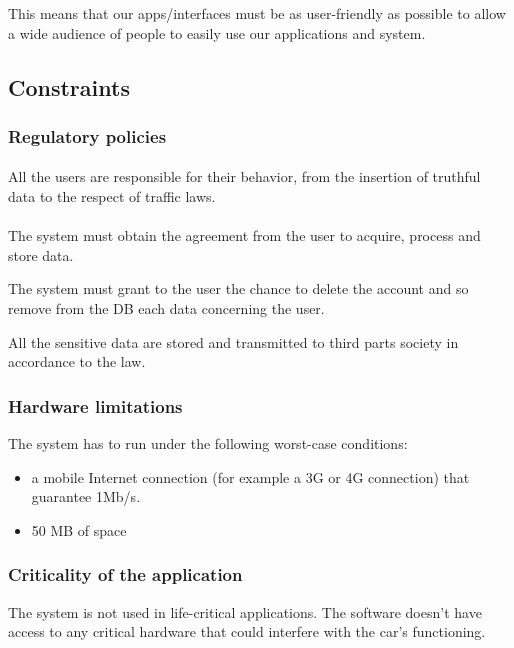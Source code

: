 \documentclass[english]{article}
\begin{document}
This means that our apps/interfaces must be as user-friendly as possible to allow a wide audience of people to easily use our applications and system.

\newpage
\subsection{Constraints}\label{constraints}

\subsubsection{Regulatory policies}

\paragraph{}
All the users are responsible for their behavior, from the insertion of truthful data to the respect of traffic laws.

\paragraph{}
The system must obtain the agreement from the user to acquire, process and store data.

The system must grant to the user the chance to delete the account and so remove from the DB each data concerning the user.

All the sensitive data are stored and transmitted to third parts society in accordance to the law.


\subsubsection{Hardware limitations}

The system has to run under the following worst-case conditions:

\begin{itemize}
  \item{a mobile Internet connection (for example a 3G or 4G connection) that guarantee 1Mb/s.}
  \item{50 MB of space}
\end{itemize}

\subsubsection{Criticality of the application}
The system is not used in life-critical applications. The software doesn't have access to any critical hardware that could interfere with the car's functioning.
\end{document}
